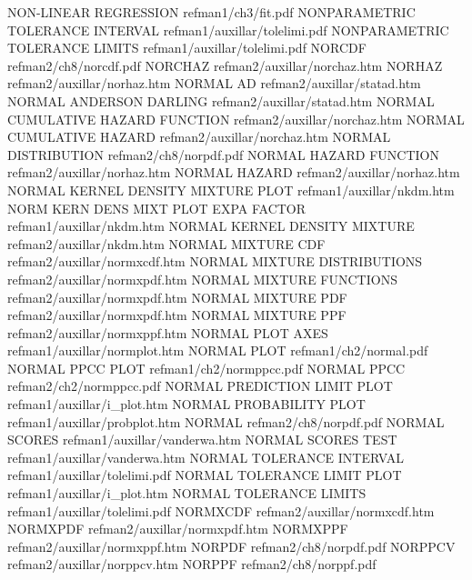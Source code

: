 NON-LINEAR REGRESSION                   refman1/ch3/fit.pdf
NONPARAMETRIC TOLERANCE INTERVAL        refman1/auxillar/tolelimi.pdf
NONPARAMETRIC TOLERANCE LIMITS          refman1/auxillar/tolelimi.pdf
NORCDF                                  refman2/ch8/norcdf.pdf
NORCHAZ                                 refman2/auxillar/norchaz.htm
NORHAZ                                  refman2/auxillar/norhaz.htm
NORMAL AD                               refman2/auxillar/statad.htm
NORMAL ANDERSON DARLING                 refman2/auxillar/statad.htm
NORMAL CUMULATIVE HAZARD FUNCTION       refman2/auxillar/norchaz.htm
NORMAL CUMULATIVE HAZARD                refman2/auxillar/norchaz.htm
NORMAL DISTRIBUTION                     refman2/ch8/norpdf.pdf
NORMAL HAZARD FUNCTION                  refman2/auxillar/norhaz.htm
NORMAL HAZARD                           refman2/auxillar/norhaz.htm
NORMAL KERNEL DENSITY MIXTURE PLOT      refman1/auxillar/nkdm.htm
NORM KERN DENS MIXT PLOT EXPA FACTOR    refman1/auxillar/nkdm.htm
NORMAL KERNEL DENSITY MIXTURE           refman2/auxillar/nkdm.htm
NORMAL MIXTURE CDF                      refman2/auxillar/normxcdf.htm
NORMAL MIXTURE DISTRIBUTIONS            refman2/auxillar/normxpdf.htm
NORMAL MIXTURE FUNCTIONS                refman2/auxillar/normxpdf.htm
NORMAL MIXTURE PDF                      refman2/auxillar/normxpdf.htm
NORMAL MIXTURE PPF                      refman2/auxillar/normxppf.htm
NORMAL PLOT AXES                        refman1/auxillar/normplot.htm
NORMAL PLOT                             refman1/ch2/normal.pdf
NORMAL PPCC PLOT                        refman1/ch2/normppcc.pdf
NORMAL PPCC                             refman2/ch2/normppcc.pdf
NORMAL PREDICTION LIMIT PLOT            refman1/auxillar/i_plot.htm
NORMAL PROBABILITY PLOT                 refman1/auxillar/probplot.htm
NORMAL                                  refman2/ch8/norpdf.pdf
NORMAL SCORES                           refman1/auxillar/vanderwa.htm
NORMAL SCORES TEST                      refman1/auxillar/vanderwa.htm
NORMAL TOLERANCE INTERVAL               refman1/auxillar/tolelimi.pdf
NORMAL TOLERANCE LIMIT PLOT             refman1/auxillar/i_plot.htm
NORMAL TOLERANCE LIMITS                 refman1/auxillar/tolelimi.pdf
NORMXCDF                                refman2/auxillar/normxcdf.htm
NORMXPDF                                refman2/auxillar/normxpdf.htm
NORMXPPF                                refman2/auxillar/normxppf.htm
NORPDF                                  refman2/ch8/norpdf.pdf
NORPPCV                                 refman2/auxillar/norppcv.htm
NORPPF                                  refman2/ch8/norppf.pdf
